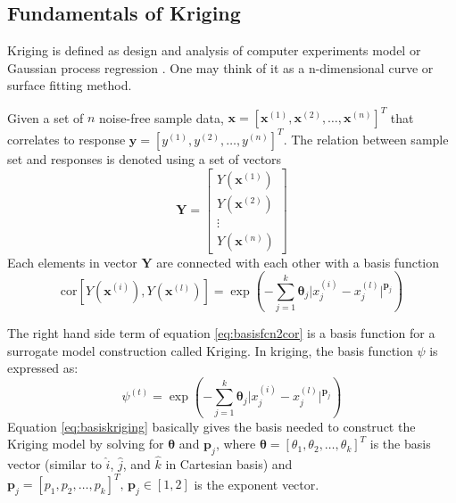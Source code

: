 \subsection{Fundamentals of Kriging}
\label{sec:14}
Kriging is defined as design and analysis of computer experiments model \citep{sacks} or Gaussian process regression \citep{williams}. One may think of it as a n-dimensional curve or surface fitting method.\par
Given a set of $n$ noise-free sample data, $\mathbf{x} = [\mathbf{x}^{(1)}, \mathbf{x}^{(2)}, \ldots, \mathbf{x}^{(n)}]^{T}$ that correlates to response $\mathbf{y} = [y^{(1)}, y^{(2)}, \ldots, y^{(n)}]^{T}$. The relation between sample set and responses is denoted using a set of vectors
\begin{equation}
    \mathbf{Y} =
        \begin{bmatrix}
            Y(\mathbf{x}^{(1)}) \\
            Y(\mathbf{x}^{(2)}) \\
            \vdots \\
            Y(\mathbf{x}^{(n)})
        \end{bmatrix}
    \label{eq:set2resp}
\end{equation}
Each elements in vector $\mathbf{Y}$ are connected with each other with a basis function
\begin{equation}
    \mathrm{cor}[Y(\mathbf{x}^{(i)}),Y(\mathbf{x}^{(l)})] = \exp\left(-\sum_{j=1}^{k}\boldsymbol{\theta}_{j}\lvert x_{j}^{(i)} - x_{j}^{(l)}\rvert^{\mathbf{p}_{j}}\right)
    \label{eq:basisfcn2cor}
\end{equation}
\par
The right hand side term of equation \ref{eq:basisfcn2cor} is a basis function for a surrogate model construction called Kriging. In kriging, the basis function $\psi$ is expressed as:
\begin{equation}
    \psi^{(t)} = \exp\left(-\sum_{j=1}^{k}\boldsymbol{\theta}_{j}\lvert x_{j}^{(i)} - x_{j}^{(l)}\rvert^{\mathbf{p}_{j}}\right)
    \label{eq:basiskriging}
\end{equation}
Equation \ref{eq:basiskriging} basically gives the basis needed to construct the Kriging model by solving for $\boldsymbol{\theta}$ and $\mathbf{p}_{j}$, where $\boldsymbol{\theta} = [\theta_{1}, \theta_{2}, \dots, \theta_{k}]^{T}$ is the basis vector (similar to $\hat{i}$, $\hat{j}$, and $\hat{k}$ in Cartesian basis) and $\mathbf{p}_{j} = [p_{1}, p_{2}, \dots, p_{k}]^{T},\, \mathbf{p}_{j}\in[1,2]$ is the exponent vector.\par

